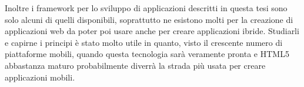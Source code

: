     Inoltre i frame\-work per lo sviluppo di applicazioni \crossplat{} descritti
    in questa tesi sono solo alcuni di quelli disponibili, soprattutto ne
    esistono molti per la creazione di applicazioni web da poter poi usare
    anche per creare applicazioni ibride. Studiarli e capirne i principi è
    stato molto utile in quanto, visto il crescente numero di piattaforme
    mobili, quando questa tecnologia sarà veramente pronta e HTML5 abbastanza
    maturo probabilmente diverrà la strada più usata per creare applicazioni
    mobili.
